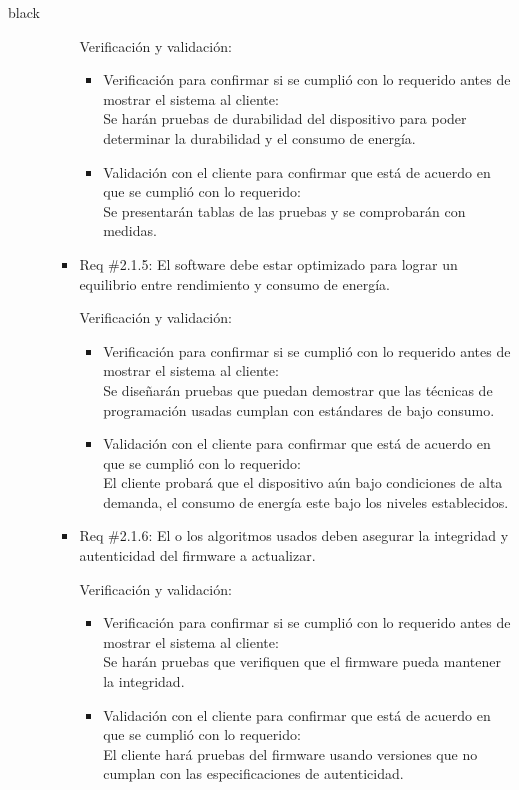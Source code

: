 \documentclass[11pt]{charter}
\begin{document}
\begin{consigna}{black}
\begin{itemize}
\begin{itemize}
\begin{itemize}
             Verificación y validación:
             \begin{itemize}
             	\item Verificación para confirmar si se cumplió con lo requerido antes de mostrar el sistema al cliente:\\
             	Se harán pruebas de durabilidad del dispositivo para poder determinar la durabilidad y el consumo de energía.
             	\item Validación con el cliente para confirmar que está de acuerdo en que se cumplió con lo requerido:\\
             	Se presentarán tablas de las pruebas y se comprobarán con medidas.
             \end{itemize}
             \item Req \#2.1.5: El software debe estar optimizado para lograr un equilibrio entre rendimiento y consumo de energía.
             
             Verificación y validación:
             \begin{itemize}
             	\item Verificación para confirmar si se cumplió con lo requerido antes de mostrar el sistema al cliente:\\
             	Se diseñarán pruebas que puedan demostrar que las técnicas de programación usadas cumplan con estándares de bajo consumo.
             	\item Validación con el cliente para confirmar que está de acuerdo en que se cumplió con lo requerido:\\
             	El cliente probará que el dispositivo aún bajo condiciones de alta demanda, el consumo de energía este bajo los niveles establecidos.
             \end{itemize}
             \item Req \#2.1.6: El o los algoritmos usados deben asegurar la integridad y autenticidad del firmware a actualizar.
             
             Verificación y validación:
             \begin{itemize}
             	\item Verificación para confirmar si se cumplió con lo requerido antes de mostrar el sistema al cliente:\\
             	Se harán pruebas que verifiquen que el firmware pueda mantener la integridad. 
             	\item Validación con el cliente para confirmar que está de acuerdo en que se cumplió con lo requerido:\\
             	El cliente hará pruebas del firmware usando versiones que no cumplan con las especificaciones de autenticidad.
             \end{itemize}
         

\end{itemize}
\end{itemize}
\end{itemize}
\end{consigna}
\end{document}
